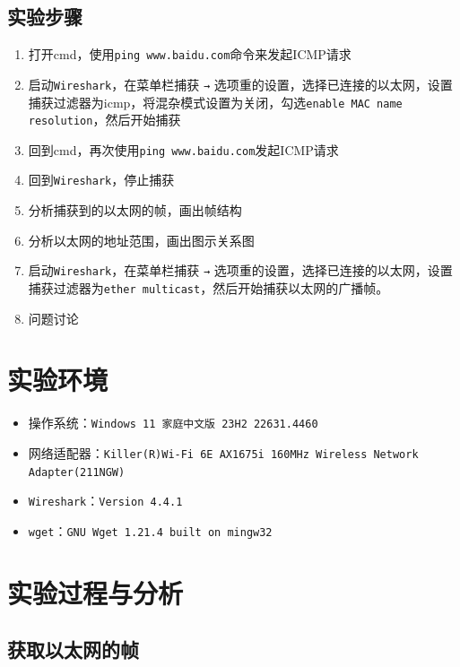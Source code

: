 \documentclass{article}
\begin{document}
	\subsection{实验步骤}
	
	\begin{enumerate}[noitemsep, label={{\arabic*})}]
		\item 打开cmd，使用\texttt{ping www.baidu.com}命令来发起ICMP请求
		\item 启动\texttt{Wireshark}，在菜单栏捕获 \texttt{→} 选项重的设置，选择已连接的以太网，设置捕获过滤器为icmp，将混杂模式设置为关闭，勾选\texttt{enable MAC name resolution}，然后开始捕获
		\item 回到cmd，再次使用\texttt{ping www.baidu.com}发起ICMP请求
		\item 回到\texttt{Wireshark}，停止捕获
		\item 分析捕获到的以太网的帧，画出帧结构
		\item 分析以太网的地址范围，画出图示关系图
		\item 启动\texttt{Wireshark}，在菜单栏捕获 \texttt{→} 选项重的设置，选择已连接的以太网，设置捕获过滤器为\texttt{ether multicast}，然后开始捕获以太网的广播帧。
		\item 问题讨论
	\end{enumerate}
	
	\section{实验环境}

	\begin{itemize}[noitemsep]
		\item 操作系统：\texttt{Windows 11 家庭中文版 23H2 22631.4460}
		\item 网络适配器：\texttt{Killer(R)Wi-Fi 6E AX1675i 160MHz Wireless Network Adapter(211NGW)}
		\item \texttt{Wireshark}：\texttt{Version 4.4.1}
		\item \texttt{wget}：\texttt{GNU Wget 1.21.4 built on mingw32}
	\end{itemize}

	\section{实验过程与分析}
	
	\subsection{获取以太网的帧}
	
\end{document}
